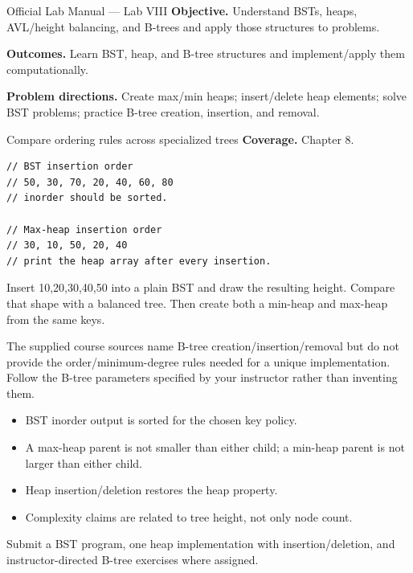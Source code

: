 
\begin{sourcealignment}{Official Lab Manual --- Lab VIII}
\textbf{Objective.} Understand BSTs, heaps, AVL/height balancing, and B-trees and apply those structures to problems.

\textbf{Outcomes.} Learn BST, heap, and B-tree structures and implement/apply them computationally.

\textbf{Problem directions.} Create max/min heaps; insert/delete heap elements; solve BST problems; practice B-tree creation, insertion, and removal.
\end{sourcealignment}

\begin{labproject}{Compare ordering rules across specialized trees}
\textbf{Coverage.} Chapter 8.

\begin{lstlisting}
// BST insertion order
// 50, 30, 70, 20, 40, 60, 80
// inorder should be sorted.

// Max-heap insertion order
// 30, 10, 50, 20, 40
// print the heap array after every insertion.
\end{lstlisting}

\begin{tryit}
Insert 10,20,30,40,50 into a plain BST and draw the resulting height. Compare that shape with a balanced tree. Then create both a min-heap and max-heap from the same keys.
\end{tryit}

\begin{labmode}
The supplied course sources name B-tree creation/insertion/removal but do not provide the order/minimum-degree rules needed for a unique implementation. Follow the B-tree parameters specified by your instructor rather than inventing them.
\end{labmode}
\end{labproject}

\begin{verification}
\begin{itemize}
  \item BST inorder output is sorted for the chosen key policy.
  \item A max-heap parent is not smaller than either child; a min-heap parent is not larger than either child.
  \item Heap insertion/deletion restores the heap property.
  \item Complexity claims are related to tree height, not only node count.
\end{itemize}
\end{verification}

\begin{labdeliverable}
Submit a BST program, one heap implementation with insertion/deletion, and instructor-directed B-tree exercises where assigned.
\end{labdeliverable}
